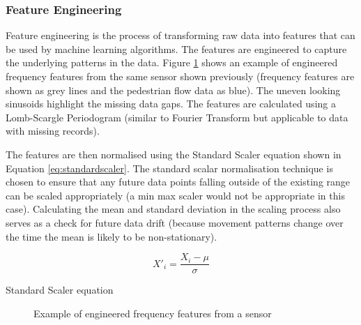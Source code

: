 \subsubsection{Feature Engineering}

Feature engineering is the process of transforming raw data into features that can be used by machine learning algorithms. The features are engineered to capture the underlying patterns in the data. Figure \ref{fig:frequency_features_example_timeseries} shows an example of engineered frequency features from the same sensor shown previously (frequency features are shown as grey lines and the pedestrian flow data as blue). The uneven looking sinusoids highlight the missing data gaps. The features are calculated using a Lomb-Scargle Periodogram (similar to Fourier Transform but applicable to data with missing records).

The features are then normalised using the Standard Scaler equation shown in Equation \ref{eq:standardscaler}. The standard scalar normalisation technique is chosen to ensure that any future data points falling outside of the existing range can be scaled appropriately (a min max scaler would not be appropriate in this case). Calculating the mean and standard deviation in the scaling process also serves as a check for future data drift (because movement patterns change over the time the mean is likely to be non-stationary).

\begin{eqfloat}[H]
    \begin{equation}
        X'_i= \frac{X_i-\mu}{\sigma}
        \label{eq:standardscaler}
    \end{equation}
    \caption{Standard Scaler equation}
\end{eqfloat}

\begin{figure}[H]
    \centering
    \caption{Example of engineered frequency features from a sensor}
    \label{fig:frequency_features_example_timeseries}
\end{figure}


